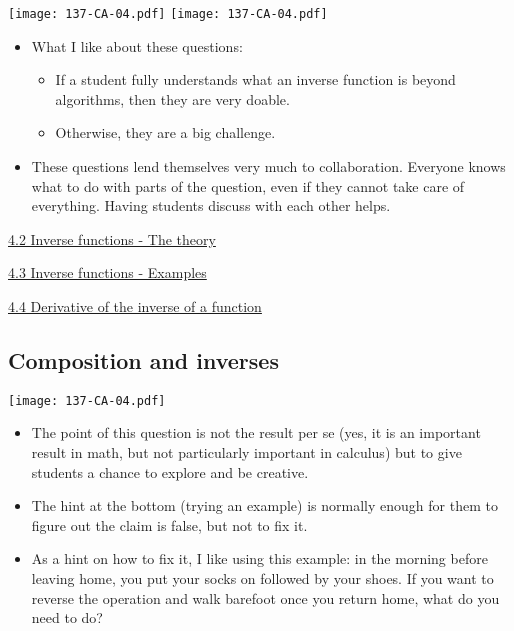 \documentclass[11pt]{article}
\newcommand{\nl}{\hfill \vspace{-1.1\baselineskip}} %
\newcommand{\vii}{\hspace{8mm} \href{https://www.youtube.com/watch?v=DxecWsEms_c&list=PLlwePzQY_wW-EDeUZebRoA8HGoeZxxpEU&index=2}{4.2 Inverse functions - The theory}}
\newcommand{\viii}{\hspace{8mm} \href{https://www.youtube.com/watch?v=bnsVbyLUZqs&list=PLlwePzQY_wW-EDeUZebRoA8HGoeZxxpEU&index=3}{4.3 Inverse functions - Examples}}
\newcommand{\viv}{\hspace{8mm} \href{https://www.youtube.com/watch?v=BMXesqZ_XCA&list=PLlwePzQY_wW-EDeUZebRoA8HGoeZxxpEU&index=4}{4.4 Derivative of the inverse of a function}}
\begin{document}
\begin{center}
{ \texttt{[image: 137-CA-04.pdf]}}  \quad
{ \texttt{[image: 137-CA-04.pdf]}}  
\end{center}


\begin{comments}
\nl
\begin{itemize}
	\item What I like about these questions:
		\begin{itemize}
			\item   If a student fully understands what an inverse function is beyond algorithms, then they are very doable.
			\item Otherwise, they are a big challenge.
		\end{itemize}
	\item These questions lend themselves very much to collaboration.  Everyone knows what to do with parts of the question, even if they cannot take care of everything.  Having students discuss with each other helps.
\end{itemize}	
\end{comments}

\begin{videos}
\vii

\viii

\viv
\end{videos}

\newpage
\subsection{Composition and inverses} 

\begin{center}
{ \texttt{[image: 137-CA-04.pdf]}} 
\end{center}


\begin{comments}
\nl
\begin{itemize}
	\item   The point of this question is not the result per se (yes, it is an important result in math, but not particularly important in calculus) but to give students a chance to explore and be creative.
	\item The hint at the bottom (trying an example) is normally enough for them to figure out the claim is false, but not to fix it.
	\item  As a hint on how to fix it, I like using this example: in the morning before leaving home, you put your socks on followed by your shoes. If you want to reverse the operation and walk barefoot once you return home, what do you need to do?
	
\end{itemize}	
\end{comments}
\end{document}
